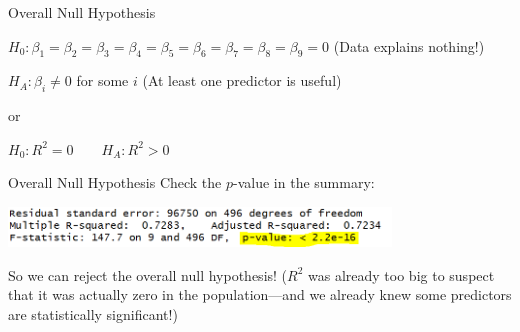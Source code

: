 \documentclass{beamer}\usepackage[]{graphicx}\usepackage[]{color}
\makeatletter
\newcommand{\hlstr}[1]{\textcolor[rgb]{1,0.894,0.71}{#1}}%
\newcommand{\hlstd}[1]{\textcolor[rgb]{1,0.894,0.769}{#1}}%
\newcommand{\hlkwc}[1]{\textcolor[rgb]{0.78,0.941,0.545}{#1}}%
\newcommand{\hlkwd}[1]{\textcolor[rgb]{1,0.78,0.769}{#1}}%
\newenvironment{kframe}{%
 \def\at@end@of@kframe{}%
 \ifinner\ifhmode%
  \def\at@end@of@kframe{\end{minipage}}%
  \begin{minipage}{\columnwidth}%
 \fi\fi%
 \def\FrameCommand##1{\hskip\@totalleftmargin \hskip-\fboxsep
 \colorbox{shadecolor}{##1}\hskip-\fboxsep
     \hskip-\linewidth \hskip-\@totalleftmargin \hskip\columnwidth}%
 \MakeFramed {\advance\hsize-\width
   \@totalleftmargin\z@ \linewidth\hsize
   \@setminipage}}%
 {\par\unskip\endMakeFramed%
 \at@end@of@kframe}
\newenvironment{knitrout}{}{} %
\makeatother
\begin{document}
\begin{darkframes}
\begin{frame}[fragile]{Overall Null Hypothesis}
      \bigskip

      $H_0: \beta_1=\beta_2=\beta_3=\beta_4=\beta_5=\beta_6=\beta_7=\beta_8=\beta_9=0$ (Data explains nothing!) \pause

      $H_A: \beta_i \neq 0$ for some $i$ (At least one predictor is useful) \pause

      or

      $H_0: R^2=0 \qquad H_A: R^2>0$
    \end{frame}



   \begin{frame}[fragile]{Overall Null Hypothesis}
      Check the $p$-value in the summary:
      \begin{center}
        \includegraphics[width=4in]{r_sq_pval} \\
      \end{center}
      So we can reject the overall null hypothesis! \pause
      \bigskip
      ($R^2$ was already too big to suspect that it was actually zero in the population---and we already knew some predictors are statistically significant!)
    \end{frame}






\end{darkframes}
\end{document}
